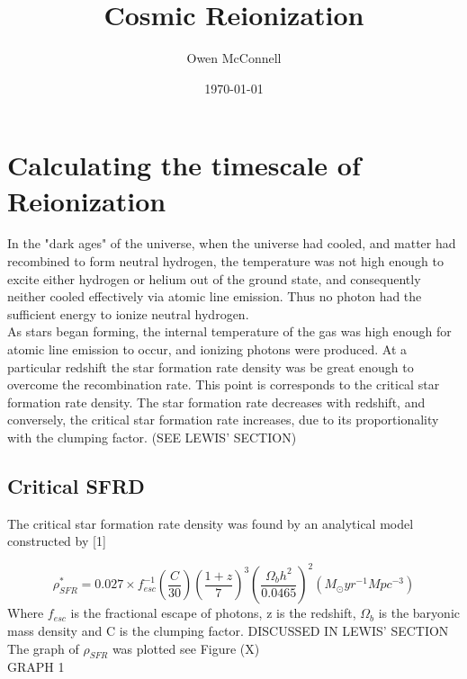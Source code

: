 \documentclass[pdf,color]{UoBnote}
\author{Owen McConnell}
\title{Cosmic Reionization}
\date{\today}
\begin{document}







\section{Calculating the timescale of Reionization}
In the "dark ages" of the universe, when the universe had cooled, and matter had recombined to form neutral hydrogen, the temperature was not high enough to excite either hydrogen or helium out of the ground state, and consequently neither cooled effectively via atomic line emission. Thus no photon had the sufficient energy to ionize neutral hydrogen. \\
\newline
As stars began forming, the internal temperature of the gas was high enough for atomic line emission to occur, and ionizing photons were produced. At a particular redshift the star formation rate density was be great enough to overcome the recombination rate. This point is corresponds to the critical star formation rate density. The star formation rate decreases with redshift, and conversely, the critical star formation rate increases, due to its proportionality with the clumping factor. (SEE LEWIS' SECTION)












\subsection{Critical SFRD}
The critical star formation rate density was found by an analytical model constructed by [1]

\begin{equation}
\rho^*_{SFR} = 0.027 \times f^{-1}_{esc} \left (\frac{C}{30} \right ) \left (\frac{1+z}{7} \right )^3 \left (\frac{\Omega_b h^2}{0.0465} \right )^2 (M_\odot yr^{-1} Mpc^{-3})
\end{equation}
Where $f_{esc}$ is the fractional escape of photons, z is the redshift, $\Omega_b$ is the baryonic mass density and C is the clumping factor. DISCUSSED IN LEWIS' SECTION The graph of $\rho_{SFR}$ was plotted see Figure (X)\\
\newline
GRAPH 1
\end{document}
